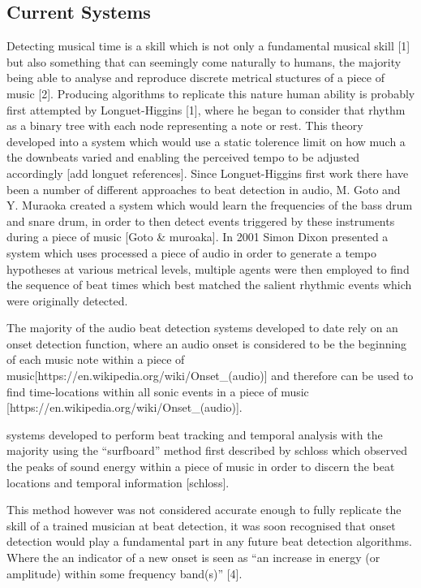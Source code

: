 \documentclass[a4paper, 11pt]{article}
\begin{document}
\subsection{Current Systems}

Detecting musical time is a skill which is not only a fundamental musical skill [1] but also something that can seemingly come naturally to humans, the majority being able to analyse and reproduce discrete metrical stuctures of a piece of music [2]. Producing algorithms to replicate this nature human ability is probably first attempted by Longuet-Higgins [1], where he began to consider that rhythm as a binary tree with each node representing a note or rest. This theory developed into a system which would use a static tolerence limit on how much a the downbeats varied and enabling the perceived tempo to be adjusted accordingly [add longuet references]. Since Longuet-Higgins first work there have been a number of different approaches to beat detection in audio, M. Goto and Y. Muraoka created a system which would learn the frequencies of the bass drum and snare drum, in order to then detect events triggered by these instruments during a piece of music [Goto & muroaka]. In 2001 Simon Dixon presented a system which uses processed a piece of audio in order to generate a tempo hypotheses at various metrical levels, multiple agents were then employed to find the sequence of beat times which best matched the salient rhythmic events which were originally detected.

The majority of the audio beat detection systems developed to date rely on an onset detection function, where an audio onset is considered to be the beginning of each music note within a piece of music[https://en.wikipedia.org/wiki/Onset_(audio)] and therefore can be used to find time-locations within all sonic events in a piece of music [https://en.wikipedia.org/wiki/Onset_(audio)]. 



systems developed to perform beat tracking and temporal analysis with the majority using the ``surfboard'' method first described by schloss which observed the peaks of sound energy within a piece of music in order to discern the beat locations and temporal information [schloss]. 

This method however was not considered accurate enough to fully replicate the skill of a trained musician at beat detection, it was soon recognised that onset detection would play a fundamental part in any future beat detection algorithms. Where the an indicator of a new onset is seen as ``an increase in energy (or amplitude) within some frequency band(s)'' [4].
\end{document}
